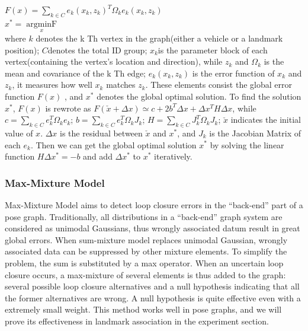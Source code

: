 \documentclass[journal]{IEEEtran}
\begin{document}
$F(x)=\sum\limits_{k \in C}e_k{(x_k,z_k)}^T{\Omega}_k e_k(x_k,z_k)$\cite{K2011G2o}\\
$x^{*} = \mathop{argminF(x)}\limits_x$\cite{K2011G2o}\\
where $k$ denotes the k Th vertex in the graph(either a vehicle or a landmark position);  
$C$denotes the total ID group; $x_k$is the parameter block of each vertex(containing the vertex’s location and direction), 
while $z_k$ and $\Omega_k$ is the mean and covariance of the k Th edge; 
$e_k(x_k,z_k)$ is the error function of $x_k$ and $z_k$, it measures how well $x_k$ matches $z_k$. 
These elements consist the global error function $F(x)$ , and $x^*$ denotes the global optimal solution.
To find the solution $x^*$, $F(x)$ is rewrote as $F(\check{x}+\Delta x)\simeq c+2b^T \Delta x + \Delta x^T H \Delta x$, 
while $c=\sum\limits_{k \in C}e_k^T \Omega_k e_k$; 
$b=\sum\limits_{k \in C}e_k^T \Omega_k J_k$; 
$H=\sum\limits_{k \in C}J_k^T \Omega_k J_k$; 
$\check{x}$ indicates the initial value of ${x}$. 
$\Delta x$ is the residual between $\check{x}$  and $x^*$, and $J_k$ is the Jacobian Matrix of each $e_k$. 
Then we can get the global optimal solution $x^*$ by solving the linear function $H\Delta x^*=-b$ and add $\Delta x^*$ to $x^*$ iteratively.

\subsubsection{Max-Mixture Model}
Max-Mixture Model \cite{Pfingsthorn2014Representing} aims to detect loop closure errors in the “back-end” part of a pose graph. 
Traditionally, all distributions in a “back-end” graph system are considered as unimodal Gaussians, thus wrongly associated datum result in great global errors. 
When sum-mixture model replaces unimodal Gaussian, wrongly associated data can be suppressed by other mixture elements. 
To simplify the problem, the sum is substituted by a max operator. 
When an uncertain loop closure occurs, a max-mixture of several elements is thus added to the graph: several possible loop closure alternatives and a null hypothesis indicating that all the former alternatives are wrong. 
A null hypothesis is quite effective even with a extremely small weight.\cite{Pfingsthorn2014Representing}  
This method works well in pose graphs\cite{Latif2014Robust}\cite{Sunderhauf2013Switchable}\cite{Cadena:2016fp}, and we will prove its effectiveness in landmark association in the experiment section.
\end{document}
